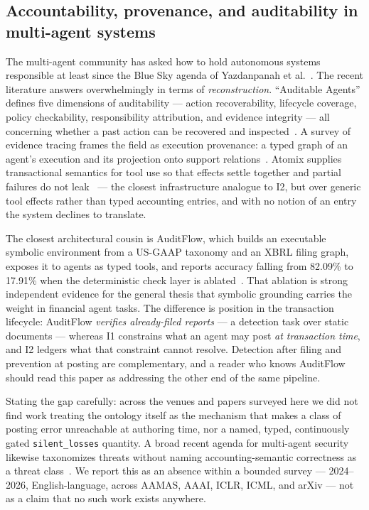 \documentclass[11pt]{clapps}  %
\begin{document}
\subsection{Accountability, provenance, and auditability in multi-agent systems}

The multi-agent community has asked how to hold autonomous systems responsible
at least since the Blue Sky agenda of Yazdanpanah et
al.~\cite{yazdanpanah2021responsibility}. The recent literature answers
overwhelmingly in terms of \emph{reconstruction}. ``Auditable Agents'' defines
five dimensions of auditability --- action recoverability, lifecycle coverage,
policy checkability, responsibility attribution, and evidence integrity --- all
concerning whether a past action can be recovered and
inspected~\cite{nian2026auditableagents}. A survey of evidence tracing frames
the field as execution provenance: a typed graph of an agent's execution and its
projection onto support relations~\cite{wang2026agenttraces}. Atomix supplies
transactional semantics for tool use so that effects settle together and partial
failures do not leak~\cite{mohammadi2026atomix} --- the closest infrastructure
analogue to I2, but over generic tool effects rather than typed accounting
entries, and with no notion of an entry the system declines to translate.

The closest architectural cousin is AuditFlow, which builds an executable
symbolic environment from a US-GAAP taxonomy and an XBRL filing graph, exposes
it to agents as typed tools, and reports accuracy falling from 82.09\% to
17.91\% when the deterministic check layer is ablated~\cite{wang2026auditflow}.
That ablation is strong independent evidence for the general thesis that
symbolic grounding carries the weight in financial agent tasks. The difference
is position in the transaction lifecycle: AuditFlow \emph{verifies already-filed
reports} --- a detection task over static documents --- whereas I1 constrains
what an agent may post \emph{at transaction time}, and I2 ledgers what that
constraint cannot resolve. Detection after filing and prevention at posting are
complementary, and a reader who knows AuditFlow should read this paper as
addressing the other end of the same pipeline.

Stating the gap carefully: across the venues and papers surveyed here we did not
find work treating the ontology itself as the mechanism that makes a class of
posting error unreachable at authoring time, nor a named, typed, continuously
gated \texttt{silent\_losses} quantity. A broad recent agenda for multi-agent
security likewise taxonomizes threats without naming accounting-semantic
correctness as a threat class~\cite{schroederdewitt2025masopenchallenges}. We
report this as an absence within a bounded survey --- 2024--2026,
English-language, across AAMAS, AAAI, ICLR, ICML, and arXiv --- not as a claim
that no such work exists anywhere.
\end{document}
